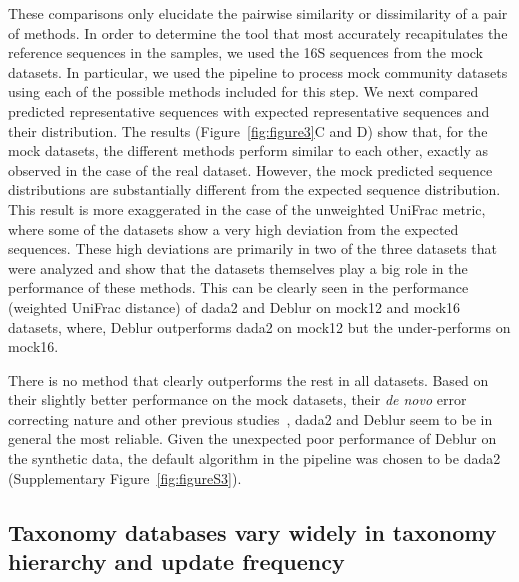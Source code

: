   These comparisons only elucidate the pairwise similarity or dissimilarity of a pair of methods.
  In order to determine the tool that most accurately recapitulates the reference sequences in the samples, we used the 16S sequences from the mock datasets.
  In particular, we used the pipeline to process mock community datasets using each of the possible methods included for this step.
  We next compared predicted representative sequences with expected representative sequences and their distribution.
  The results (Figure~\ref{fig:figure3}C and D) show that, for the mock datasets, the different methods perform similar to each other, exactly as observed in the case of the real dataset. However, the mock predicted sequence distributions are substantially different from the expected sequence distribution.
  This result is more exaggerated in the case of the unweighted UniFrac metric, where some of the datasets show a very high deviation from the expected sequences.
  These high deviations are primarily in two of the three datasets that were analyzed and show that the datasets themselves play a big role in the performance of these methods.
  This can be clearly seen in the performance (weighted UniFrac distance) of \ac{dada2} and Deblur on mock12 and mock16 datasets, where, Deblur outperforms \ac{dada2} on mock12 but the under-performs on mock16.

  There is no method that clearly outperforms the rest in all datasets.
  Based on their slightly better performance on the mock datasets, their \textit{de novo} error correcting nature and other previous studies~\cite{Nearing2018}, \ac{dada2} and Deblur seem to be in general the most reliable.
  Given the unexpected poor performance of Deblur on the synthetic data, the default algorithm in the pipeline was chosen to be \ac{dada2} (Supplementary Figure~\ref{fig:figureS3}).

  \FloatBarrier

  \subsection*{Taxonomy databases vary widely in taxonomy hierarchy and update frequency}


